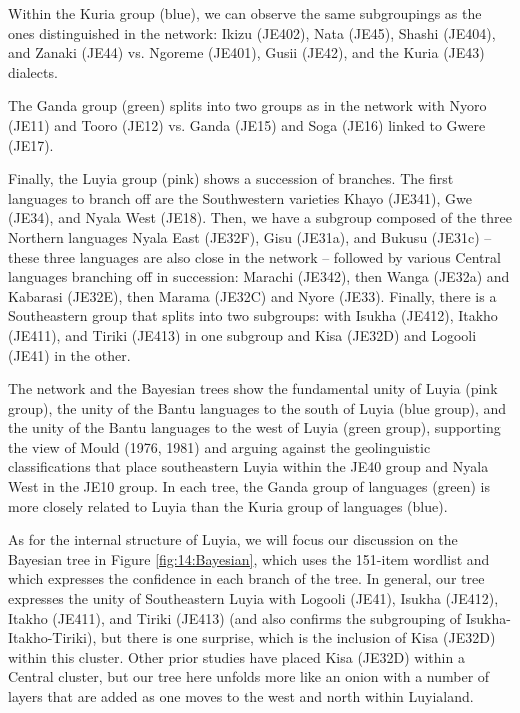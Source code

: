 \documentclass[output=paper]{langscibook}
\begin{document}
Within the Kuria group (blue), we can observe the same subgroupings as the ones distinguished in the network: Ikizu (JE402), Nata (JE45), Shashi (JE404), and Zanaki (JE44) vs. Ngoreme (JE401), Gusii (JE42), and the Kuria (JE43) dialects. 

The Ganda group (green) splits into two groups as in the network with Nyoro (JE11) and Tooro (JE12) vs. Ganda (JE15) and Soga (JE16) linked to Gwere (JE17). 

Finally, the Luyia group (pink) shows a succession of branches. The first languages to branch off are the Southwestern varieties Khayo (JE341), Gwe (JE34), and Nyala West (JE18). Then, we have a subgroup composed of the three Northern languages Nyala East (JE32F), Gisu (JE31a), and Bukusu (JE31c) -- these three languages are also close in the network -- followed by various Central languages branching off in succession: Marachi (JE342), then Wanga (JE32a) and Kabarasi (JE32E), then Marama (JE32C) and Nyore (JE33). Finally, there is a Southeastern group that splits into two subgroups: with Isukha (JE412), Itakho (JE411), and Tiriki (JE413) in one subgroup and Kisa (JE32D) and Logooli (JE41) in the other.

The network and the Bayesian trees show the fundamental unity of Luyia (pink group), the unity of the Bantu languages to the south of Luyia (blue group), and the unity of the Bantu languages to the west of Luyia (green group), supporting the view of Mould (1976, 1981) and arguing against the geolinguistic classifications that place southeastern Luyia within the JE40 group and Nyala West in the JE10 group. In each tree, the Ganda group of languages (green) is more closely related to Luyia than the Kuria group of languages (blue). 

As for the internal structure of Luyia, we will focus our discussion on the Bayesian tree in Figure \ref{fig:14:Bayesian}, which uses the 151-item wordlist and which expresses the confidence in each branch of the tree. In general, our tree expresses the unity of Southeastern Luyia with Logooli (JE41), Isukha (JE412), Itakho (JE411), and Tiriki (JE413) (and also confirms the subgrouping of Isukha-Itakho-Tiriki), but there is one surprise, which is the inclusion of Kisa (JE32D) within this cluster. Other prior studies have placed Kisa (JE32D) within a Central cluster, but our tree here unfolds more like an onion with a number of layers that are added as one moves to the west and north within Luyialand.
\end{document}
